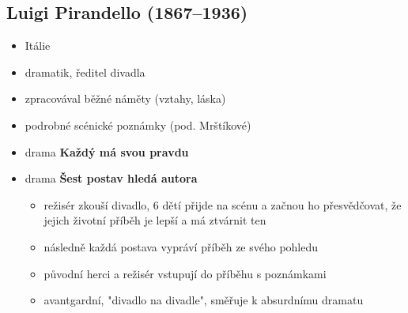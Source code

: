 \subsection{Luigi Pirandello (1867--1936)}
\begin{itemize}
\item Itálie
\item dramatik, ředitel divadla
\item zpracovával běžné náměty (vztahy, láska)
\item podrobné scénické poznámky (pod. Mrštíkové)
\item drama \textbf{Každý má svou pravdu}
\item drama \textbf{Šest postav hledá autora}
	\begin{itemize}
	\item režisér zkouší divadlo, 6 dětí přijde na scénu a začnou ho přesvědčovat, že jejich životní příběh je lepší a má ztvárnit ten
	\item následně každá postava vypráví příběh ze svého pohledu
	\item původní herci a režisér vstupují do příběhu s poznámkami
	\item avantgardní, "divadlo na divadle", směřuje k absurdnímu dramatu
	\end{itemize}
\end{itemize}


